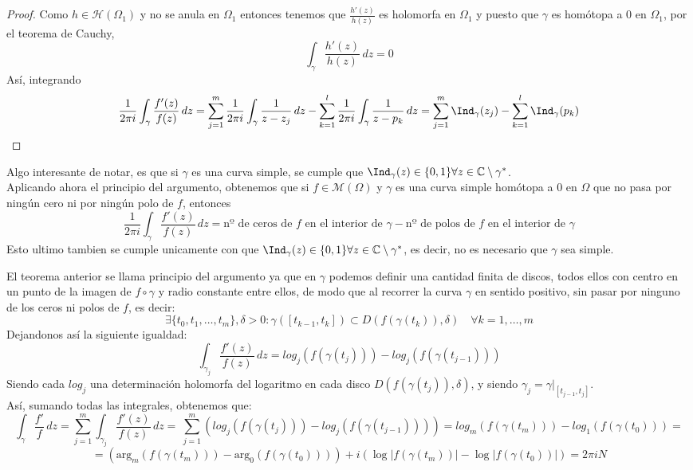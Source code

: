 \begin{proof}
    Como $h \in \mathcal{H}(\Omega_1)$ y no se anula en $\Omega_1$ entonces tenemos que $\frac{h'(z)}{h(z)}$ es holomorfa en $\Omega_1$ y puesto que $\gamma$ es homótopa a $0$ en $\Omega_1$, por el teorema de Cauchy,
    \[
        \int_{\gamma} \frac{h'(z)}{h(z)} \, dz = 0
    \]
    Así, integrando
    \[
        \frac{1}{2 \pi i} \int_{\gamma} \frac{f'(z)}{f(z)} \, dz = \sum_{j=1}^{m} \frac{1}{2 \pi i} \int_{\gamma} \frac{1}{z - z_j} \, dz - \sum_{k=1}^{l} \frac{1}{2 \pi i} \int_{\gamma} \frac{1}{z - p_k} \, dz = \sum_{j=1}^{m} \Ind_{\gamma}(z_j) - \sum_{k=1}^{l} \Ind_{\gamma}(p_k)
    \]
\end{proof}

\begin{corolario}
    Algo interesante de notar, es que si $\gamma$ es una curva simple, se cumple que $\Ind_\gamma(z) \in \{0,1\} \forall z \in \mathbb{C} \setminus \gamma^*$.\\
    Aplicando ahora el principio del argumento, obtenemos que si $f \in \mathcal{M}(\Omega)$ y $\gamma$ es una curva simple homótopa a $0$ en $\Omega$ que no pasa por ningún cero ni por ningún polo de $f$, entonces
    \[
        \frac{1}{2 \pi i} \int_{\gamma} \frac{f'(z)}{f(z)} \, dz = \text{nº de ceros de } f \text{ en el interior de } \gamma - \text{nº de polos de } f \text{ en el interior de } \gamma
    \]
    Esto ultimo tambien se cumple unicamente con que $\Ind_{\gamma}(z) \in \{0,1\} \forall z \in \mathbb{C} \setminus \gamma^*$, es decir, no es necesario que $\gamma$ sea simple.
\end{corolario}

El teorema anterior se llama principio del argumento ya que en $\gamma$ podemos definir una cantidad finita de discos, todos ellos con centro en un punto de la imagen de $f \circ \gamma$ y radio constante entre ellos, de modo que al recorrer la curva $\gamma$ en sentido positivo, sin pasar por ninguno de los ceros ni polos de $f$, es decir:
\[
\exists \{t_0, t_1, \ldots, t_m\}, \delta >0 :
\gamma ([t_{k-1}, t_k]) \subset D(f(\gamma(t_k)), \delta) \quad \forall k = 1, \ldots, m
\]
Dejandonos así la siguiente igualdad:
\[
\int_{\gamma_j} \frac{f'(z)}{f(z)} \, dz = 
log_j(f(\gamma(t_j))) - log_j(f(\gamma(t_{j-1})))
\]
Siendo cada $log_j$ una determinación holomorfa del logaritmo en cada disco $D(f(\gamma(t_j)), \delta)$, y siendo $\gamma_j = \gamma|_{[t_{j-1}, t_j]}$.\\
Así, sumando todas las integrales, obtenemos que:
\[
\int_{\gamma} \frac{f'}{f} \, dz = 
\sum_{j=1}^{m} \int_{\gamma_j} \frac{f'(z)}{f(z)} \, dz = \
\sum_{j=1}^{m} \left( log_j(f(\gamma(t_j))) - log_j(f(\gamma(t_{j-1}))) \right) =
log_m(f(\gamma(t_m))) - log_1(f(\gamma(t_0))) =
\]
\[
= \left( \text{arg}_m(f(\gamma(t_m))) - \text{arg}_0(f(\gamma(t_0))) \right) + i \left( \log|f(\gamma(t_m))| - \log|f(\gamma(t_0))| \right) =
2 \pi i N
\]

